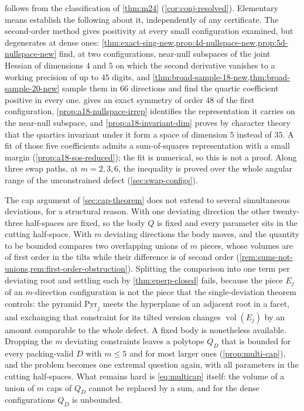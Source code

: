 \documentclass[11pt,reqno]{amsart}
\renewcommand{\_}{\origunderscore\allowbreak}
\numberwithin{equation}{section}
\theoremstyle{plain}
\theoremstyle{definition}
\theoremstyle{remark}
\DeclareMathOperator{\vol}{vol}
\begin{document}
 follows from the classification of
\cref{thm:m24} (\cref{cor:conj-resolved}). Elementary means establish the
following about it, independently of any certificate. The second-order
method gives positivity at every small configuration examined, but
degenerates at dense ones:
\cref{thm:exact-sing-new,prop:4d-nullspace-new,prop:5d-nullspace-new}
find, at two configurations, near-null subspaces of the joint Hessian of
dimensions $4$ and $5$ on which the second derivative vanishes to a working
precision of up to $45$ digits, and
\cref{thm:broad-sample-18-new,thm:broad-sample-20-new} sample them in $66$
directions and find the quartic coefficient positive in every one.
 gives an exact symmetry of order $48$ of the
first configuration, \cref{prop:a18-nullspace-irrep} identifies the
representation it carries on the near-null subspace, and
\cref{prop:a18-invariant-dim} proves by character theory that the quartics
invariant under it form a space of dimension $5$ instead of $35$. A fit of
those five coefficients admits a sum-of-squares representation with a small
margin (\cref{prop:a18-sos-reduced}); the fit is numerical, so this is
not a proof. Along three swap paths, at $m=2,3,6$, the
inequality is proved over the whole angular range of the unconstrained
defect (\cref{sec:swap-configs}).

The cap argument of \cref{sec:cap-theorem} does not extend to several
simultaneous deviations, for a structural reason. With one deviating
direction the other twenty-three half-spaces are fixed, so the body $Q$ is
fixed and every parameter sits in the cutting half-space. With $m$
deviating directions the body moves, and the quantity to be bounded
compares two overlapping unions of $m$ pieces, whose volumes are of first
order in the tilts while their difference is of second order
(\cref{rem:sums-not-unions,rem:first-order-obstruction}). Splitting the
comparison into one term per deviating root and settling each by
\cref{thm:eperp-closed} fails, because the piece $E_j$ of an
$m$-direction configuration is not the piece that the single-deviation
theorem controls: the pyramid $\mathrm{Pyr}_j$ meets the hyperplane of an
adjacent root in a facet, and exchanging that constraint for its tilted
version changes $\vol(E_j)$ by an amount comparable to the whole defect.
A fixed body is nonetheless available. Dropping the $m$ deviating
constraints leaves a polytope $Q_D$ that is bounded for every
packing-valid $D$ with $m\le5$ and for most larger ones
(\cref{prop:multi-cap}), and the problem becomes one extremal question
again, with all parameters in the cutting half-spaces. What remains hard is
\eqref{eq:multicap} itself: the volume of a union of $m$ caps of $Q_D$
cannot be replaced by a sum, and for the dense configurations $Q_D$ is
unbounded.
\end{document}
